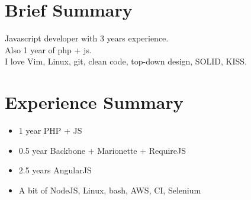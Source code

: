 \documentclass[a4paper, 14pt]{article}
\begin{document}
\begin{center}
	\textsc{\Huge{}}
\end{center}


\section{Brief Summary}
    Javascript developer with 3 years experience.  \\
    Also 1 year of php + js. \\
    I love Vim, Linux, git, clean code, top-down design, SOLID, KISS.

\section{Experience Summary}
  \begin{itemize}
    \item 1 year PHP + JS \\ 
    \item 0.5 year Backbone + Marionette + RequireJS \\ 
    \item 2.5 years AngularJS \\ 
    \item A bit of NodeJS, Linux, bash, AWS, CI, Selenium
  \end{itemize}
\end{document}
